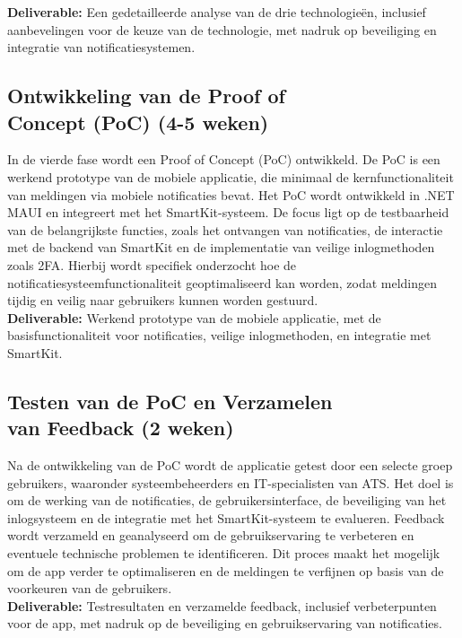 \noindent \textbf{Deliverable:} Een gedetailleerde analyse van de drie technologieën, inclusief aanbevelingen voor de keuze van de technologie, met nadruk op beveiliging en integratie van notificatiesystemen.

\subsection{Ontwikkeling van de Proof of \\Concept (PoC) (4-5 weken)}
\noindent In de vierde fase wordt een Proof of Concept (PoC) ontwikkeld. De PoC is een werkend prototype van de mobiele applicatie, die minimaal de kernfunctionaliteit van meldingen via mobiele notificaties bevat. Het PoC wordt ontwikkeld in .NET MAUI en integreert met het SmartKit-systeem. De focus ligt op de testbaarheid van de belangrijkste functies, zoals het ontvangen van notificaties, de interactie met de backend van SmartKit en de implementatie van veilige inlogmethoden zoals 2FA. Hierbij wordt specifiek onderzocht hoe de notificatiesysteemfunctionaliteit geoptimaliseerd kan worden, zodat meldingen tijdig en veilig naar gebruikers kunnen worden gestuurd. \\

\noindent \textbf{Deliverable:} Werkend prototype van de mobiele applicatie, met de basisfunctionaliteit voor notificaties, veilige inlogmethoden, en integratie met SmartKit.

\subsection{Testen van de PoC en Verzamelen \\van Feedback (2 weken)}
\noindent Na de ontwikkeling van de PoC wordt de applicatie getest door een selecte groep gebruikers, waaronder systeembeheerders en IT-specialisten van ATS. Het doel is om de werking van de notificaties, de gebruikersinterface, de beveiliging van het inlogsysteem en de integratie met het SmartKit-systeem te evalueren. Feedback wordt verzameld en geanalyseerd om de gebruikservaring te verbeteren en eventuele technische problemen te identificeren. Dit proces maakt het mogelijk om de app verder te optimaliseren en de meldingen te verfijnen op basis van de voorkeuren van de gebruikers. \\

\noindent \textbf{Deliverable:} Testresultaten en verzamelde feedback, inclusief verbeterpunten voor de app, met nadruk op de beveiliging en gebruikservaring van notificaties.

